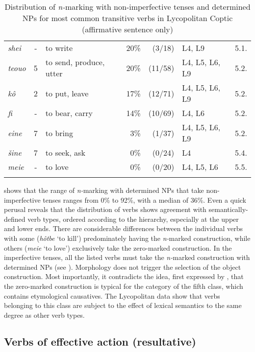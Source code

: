 \documentclass[output=paper]{LSP/langsci}
\begin{document}
\begin{table}[b]
{\begin{tabular}{lclrrlr}
\textit{shei} & {}- & to write & 20\% &  (3/18) & L4, L9 & 5.1.\\
\textit{teouo} & 5 & to send, produce, utter & 20\% &  (11/58) & L4, L5, L6, L9 & 5.2.\\
\textit{kô} & 2 & to put, leave & 17\% &  (12/71) & L4, L5, L6, L9 & 5.2.\\
\textit{fi} & {}- & to bear, carry & 14\% &  (10/69) & L4, L6 & 5.2.\\
\textit{eine} & 7 & to bring & 3\% &  (1/37) & L4, L5, L6, L9 & 5.2.\\
\textit{šine} & 7 & to seek, ask & 0\% & (0/24) & L4 & 5.4.\\
\textit{meie} & {}- & to love & 0\%  & (0/20) & L4, L5, L6 & 5.5.\\
\lspbottomrule
\end{tabular}
}
\caption{Distribution of \textit{n-}marking with non-imperfective tenses and determined NPs for most common transitive verbs in Lycopolitan Coptic (affirmative sentence only)}\label{06-en-tab:5}
\end{table}

 shows that the range of \textit{n-}marking with determined NPs that take non-im\-per\-fective tenses ranges from 0\% to 92\%, with a median of 36\%. Even a quick perusal reveals that the distribution of verbs shows agreement with semantically-defined verb types, ordered according to the  hierarchy, especially at the upper and lower ends. There are considerable differences between the individual verbs with some (\eg \textit{hôtbe} ‘to kill’) predominately having the \textit{n-}marked construction, while others (\eg \textit{meie} ‘to love’) exclusively take the zero-marked construction. In the imperfective tenses, all the listed verbs must take the \textit{n-}marked construction with determined NPs (see ). Morphology does not trigger the selection of the object construction. Most importantly, it contradicts the idea, first expressed by \citet[165]{Steindorff1894Koptische}, that the zero-marked construction is typical for the category of the fifth class, which contains etymological causatives. The Lycopolitan data show that verbs belonging to this class are subject to the effect of lexical semantics to the same degree as other verb types.

\subsection{Verbs of effective action (resultative)}
\label{06-en-sec:5-1}
\end{document}
